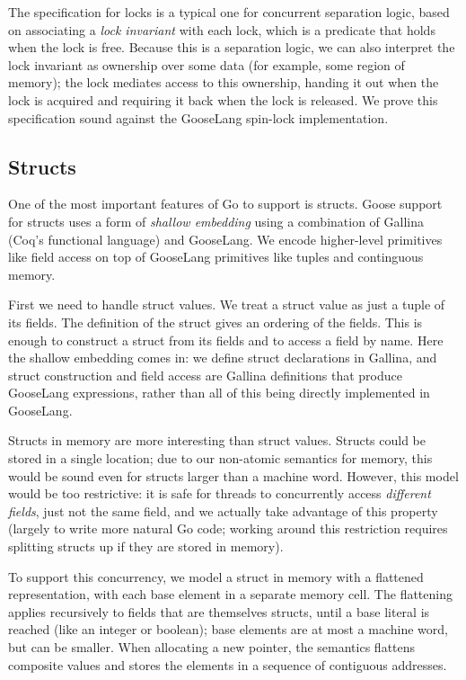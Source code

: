The specification for locks is a typical one for concurrent separation logic,
based on associating a \emph{lock invariant} with each lock, which is a predicate that holds when the lock
is free. Because this is a separation logic, we can also interpret the lock
invariant as ownership over some data (for example, some region of memory); the
lock mediates access to this ownership, handing it out when the lock is acquired
and requiring it back when the lock is released. We prove this specification
sound against the GooseLang spin-lock implementation.

\subsection{Structs}


One of the most important features of Go to support is structs. Goose support
for structs uses a form of \emph{shallow embedding} using a combination of
Gallina (Coq's functional language) and GooseLang. We encode
higher-level primitives like field access on top of GooseLang primitives like
tuples and continguous memory.

First we need to handle struct values. We treat a struct value as just a tuple
of its fields. The definition of the struct gives an ordering of the fields.
This is enough to construct a struct from its fields and to access a field by
name. Here the shallow embedding comes in: we define struct declarations in
Gallina, and struct construction and field access are Gallina definitions that
produce GooseLang expressions, rather than all of this being directly
implemented in GooseLang.

Structs in memory are more interesting than struct values. Structs could
be stored in a single location; due to our non-atomic semantics for
memory, this would be sound even for structs larger than a machine word.
However, this model would be too restrictive: it is safe for threads to
concurrently access \emph{different fields}, just not the same field,
and we actually take advantage of this property (largely to write more
natural Go code; working around this restriction requires splitting
structs up if they are stored in memory).

To support this concurrency, we model a struct in memory with a
flattened representation, with each base element in a separate memory
cell. The flattening applies recursively to fields that are themselves
structs, until a base literal is reached (like an integer or boolean);
base elements are at most a machine word, but can be smaller. When
allocating a new pointer, the semantics flattens composite values and
stores the elements in a sequence of contiguous addresses.

